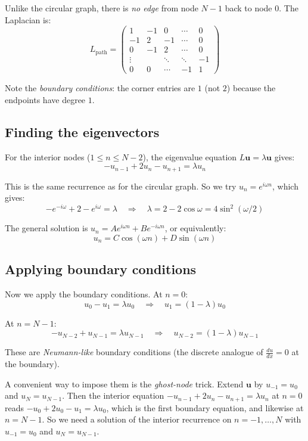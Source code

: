 \begin{notechapter}
\begin{center}
\end{center}

Unlike the circular graph, there is \emph{no edge} from node $N-1$
back to node $0$. The Laplacian is:
\[
L_{\text{path}} = \begin{pmatrix}
1 & -1 & 0 & \cdots & 0 \\
-1 & 2 & -1 & \cdots & 0 \\
0 & -1 & 2 & \cdots & 0 \\
\vdots & & \ddots & \ddots & -1 \\
0 & 0 & \cdots & -1 & 1
\end{pmatrix}
\]

Note the \emph{boundary conditions}: the corner entries are $1$ (not
$2$) because the endpoints have degree $1$.

\subsection{Finding the eigenvectors}

For the interior nodes ($1 \leq n \leq N-2$), the eigenvalue equation
$L\mathbf{u} = \lambda \mathbf{u}$ gives:
\[
-u_{n-1} + 2u_n - u_{n+1} = \lambda u_n
\]

This is the same recurrence as for the circular graph. So we try
$u_n = e^{i\omega n}$, which gives:
\[
-e^{-i\omega} + 2 - e^{i\omega} = \lambda
\quad \Rightarrow \quad
\lambda = 2 - 2\cos\omega = 4\sin^2(\omega/2)
\]

The general solution is $u_n = A e^{i\omega n} + B e^{-i\omega n}$, or
equivalently:
\[
u_n = C \cos(\omega n) + D \sin(\omega n)
\]

\subsection{Applying boundary conditions}

Now we apply the boundary conditions. At $n = 0$:
\[
u_0 - u_1 = \lambda u_0 \quad \Rightarrow \quad
u_1 = (1 - \lambda) u_0
\]

At $n = N-1$:
\[
-u_{N-2} + u_{N-1} = \lambda u_{N-1} \quad \Rightarrow \quad
u_{N-2} = (1 - \lambda) u_{N-1}
\]

These are \emph{Neumann-like} boundary conditions (the discrete
analogue of $\frac{du}{dx} = 0$ at the boundary).

A convenient way to impose them is the \emph{ghost-node} trick. Extend $\mathbf u$ by $u_{-1} = u_0$ and $u_N = u_{N-1}$. Then the interior equation $-u_{n-1} + 2u_n - u_{n+1} = \lambda u_n$ at $n = 0$ reads $-u_0 + 2u_0 - u_1 = \lambda u_0$, which is the first boundary equation, and likewise at $n = N-1$. So we need a solution of the interior recurrence on $n = -1, \ldots, N$ with $u_{-1} = u_0$ and $u_N = u_{N-1}$.


\end{notechapter}
